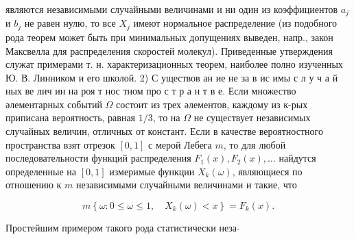 \documentclass[10pt]{article}
\begin{document}
являются независимыми случайными величинами и ни один из коэффициентов $a_{j}$ и $b_{j}$ не равен нулю, то все $X_{j}$ имеют нормальное распределение (из подобного рода теорем может быть при минимальных допущениях выведен, напр., закон Максвелла для распределения скоростей молекул). Приведенные утверждения служат примерами т. н. характеризационных теорем, наиболее полно изученных Ю. В. Линником и его школой. 2) С уществов ан ие не за в ис имы с л у ч а й ных ве лич ин на роя т нос тном про с т р а н т в е. Если множество әлементарных событий $\Omega$ состоит из трех әлементов, каждому из к-рых приписана вероятность, равная $1 / 3$, то на $\Omega$ не существует независимых случайных величин, отличных от констант. Если в качестве вероятностного пространства взят отрезок $[0,1]$ с мерой Лебега $m$, то для любой последовательности функций распределения $F_{1}(x), F_{2}(x), \ldots$ найдутся определенные на $[0,1]$ измеримые функции $X_{k}(\omega)$, являющиеся по отношению к $m$ независимыми случайными величинами и такие, что



\[

m\left\{\omega: 0 \leqslant \omega \leqslant 1, \quad X_{k}(\omega)<x\right\}=F_{k}(x) .

\]



Простейшим примером такого рода статистически неза-
\end{document}
